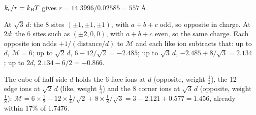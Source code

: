 $k_{\mathrm e}/r = k_{\mathrm{B}} T$ gives $r = 14.3996/0.02585 =
\SI{557}{\angstrom}$.

At $\sqrt3\,d$: the 8 sites $(\pm1, \pm1,
\pm1)$, with $a + b + c$ odd, so opposite in charge. At $2d$: the 6 sites
such as $(\pm2, 0, 0)$, with $a + b + c$ even, so the same charge. Each
opposite ion adds $+1/(\text{distance}/d)$ to $\mathcal{M}$ and each like ion
subtracts that: up to $d$, $\mathcal{M} = 6$; up to $\sqrt2\,d$, $6 - 12/\sqrt2 =
-2.485$; up to $\sqrt3\,d$, $-2.485 + 8/\sqrt3 = 2.134$; up to $2d$, $2.134
- 6/2 = -0.866$.

The cube of half-side $d$ holds the 6 face ions at
$d$ (opposite, weight $\frac12$), the 12 edge ions at $\sqrt2\,d$ (like,
weight $\frac14$) and the 8 corner ions at $\sqrt3\,d$ (opposite, weight
$\frac18$): $\mathcal{M} = 6\times\frac12 - 12\times\frac14/\sqrt2 + 8\times
\frac18/\sqrt3 = 3 - 2.121 + 0.577 = 1.456$, already within 17\% of
1.7476.
